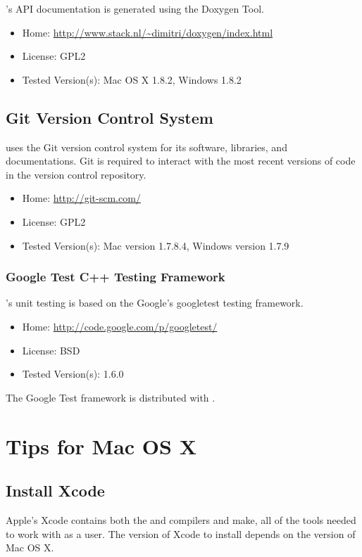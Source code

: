 \Stan's API documentation is generated using the Doxygen Tool.
%
\begin{itemize}
\item Home: \url{http://www.stack.nl/~dimitri/doxygen/index.html}
\item License: GPL2
\item Tested Version(s): Mac OS X 1.8.2, Windows 1.8.2
\end{itemize}


\subsection{Git Version Control System}

\Stan uses the Git version control system for its software, libraries,
and documentations.  Git is required to interact with the most recent
versions of code in the version control repository.
% 
\begin{itemize}
\item Home: \url{http://git-scm.com/}
\item License: GPL2
\item Tested Version(s): Mac version 1.7.8.4, Windows version 1.7.9
\end{itemize}


\subsubsection{Google Test C++ Testing Framework}

\Stan's unit testing is based on the Google's googletest \Cpp testing
framework.  
%
\begin{itemize}
\item
Home: \url{http://code.google.com/p/googletest/}
\item
License: BSD
\item
Tested Version(s): 1.6.0
\end{itemize}
%
The Google Test framework is distributed with \Stan.


\section{Tips for Mac OS X}

\subsection{Install Xcode}

Apple's Xcode contains both the \clang and \gpp compilers and make, all of the tools 
needed to work with \Stan as a user. The version of Xcode to install depends on the
version of Mac OS X.

